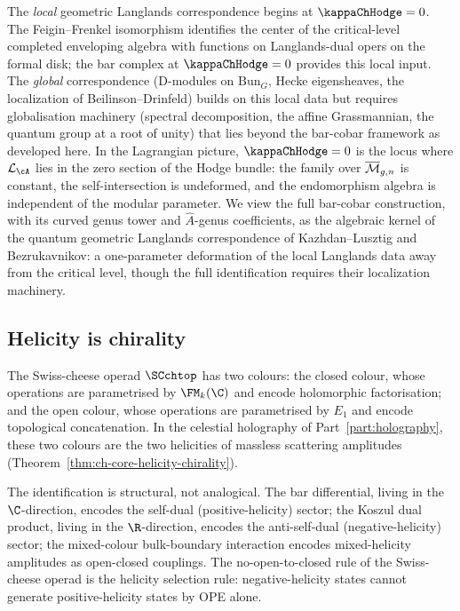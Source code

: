 The \emph{local} geometric Langlands correspondence begins at
$\kappaChHodge = 0$. The Feigin--Frenkel isomorphism identifies the
center of the critical-level completed enveloping algebra with
functions on Langlands-dual opers on the formal disk; the bar
complex at $\kappaChHodge = 0$ provides this local input. The
\emph{global} correspondence (D-modules on $\mathrm{Bun}_G$,
Hecke eigensheaves, the localization of Beilinson--Drinfeld)
builds on this local data but requires globalisation machinery
(spectral decomposition, the affine Grassmannian, the
quantum group at a root of unity) that lies beyond the
bar-cobar framework as developed here.
In the Lagrangian picture, $\kappaChHodge = 0$ is
the locus where $\cL_\cA$ lies in the zero section of
the Hodge bundle: the family over $\overline{\mathcal M}_{g,n}$ is constant, the
self-intersection is undeformed, and the endomorphism algebra is
independent of the modular parameter. We view the full bar-cobar
construction, with its curved genus tower and $\hat{A}$-genus
coefficients, as the algebraic kernel of the quantum geometric
Langlands correspondence of Kazhdan--Lusztig and Bezrukavnikov: a
one-parameter deformation of the local Langlands data away from
the critical level, though the full identification requires their
localization machinery.

\subsection{Helicity is chirality}
\label{subsec:conclusion-helicity-chirality}

The Swiss-cheese operad $\SCchtop$ has two colours: the closed colour,
whose operations are parametrised by $\FM_k(\C)$ and encode
holomorphic factorisation; and the open colour, whose operations are
parametrised by $E_1$ and encode topological concatenation. In the
celestial holography of Part~\ref{part:holography}, these two colours are the two
helicities of massless scattering amplitudes
(Theorem~\ref{thm:ch-core-helicity-chirality}).

The identification is structural, not analogical. The bar
differential, living in the $\C$-direction, encodes the
self-dual (positive-helicity) sector; the Koszul dual product, living in the $\R$-direction, encodes the anti-self-dual
(negative-helicity) sector; the mixed-colour bulk-boundary
interaction encodes mixed-helicity amplitudes as open-closed
couplings. The no-open-to-closed rule of the Swiss-cheese operad
is the helicity selection rule:
negative-helicity states cannot generate positive-helicity states by
OPE alone.

